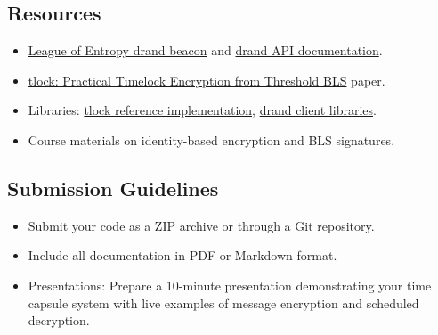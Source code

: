 \documentclass[10pt,a4paper,american]{exam}
\begin{document}
\subsection*{Resources}
\begin{itemize}
	\item \href{https://drand.love/}{League of Entropy drand beacon} and \href{https://api.drand.sh/}{drand API documentation}.
	\item \href{https://appliedcryptography.page/paper/\#tlock-bls}{tlock: Practical Timelock Encryption from Threshold BLS} paper.
	\item Libraries: \href{https://github.com/drand/tlock}{tlock reference implementation}, \href{https://github.com/drand/drand-client}{drand client libraries}.
	\item Course materials on identity-based encryption and BLS signatures.
\end{itemize}

\subsection*{Submission Guidelines}
\begin{itemize}
	\item Submit your code as a ZIP archive or through a Git repository.
	\item Include all documentation in PDF or Markdown format.
	\item Presentations: Prepare a 10-minute presentation demonstrating your time capsule system with live examples of message encryption and scheduled decryption.
\end{itemize}
\end{document}

